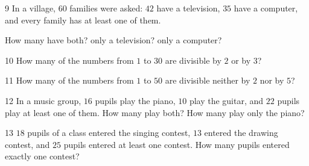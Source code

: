 \gap
\begin{probbox}{9}{\relax}
In a village, $60$ families were asked: $42$ have a television, $35$ have a computer, and every family has at least one of them.\par
{} How many have both? \quad {} only a television? \quad {} only a computer?
\end{probbox}
\gap
\begin{probbox}{10}{\relax}
How many of the numbers from $1$ to $30$ are divisible by $2$ or by $3$?
\end{probbox}
\gap
\begin{probbox}{11}{\relax}
How many of the numbers from $1$ to $50$ are divisible neither by $2$ nor by $5$?
\end{probbox}
\gap
\begin{probbox}{12}{\relax}
In a music group, $16$ pupils play the piano, $10$ play the guitar, and $22$ pupils play at least one of them. How many play both? How many play only the piano?
\end{probbox}
\gap
\begin{probbox}{13}{\relax}
$18$ pupils of a class entered the singing contest, $13$ entered the drawing contest, and $25$ pupils entered at least one contest. How many pupils entered exactly one contest?
\end{probbox}
